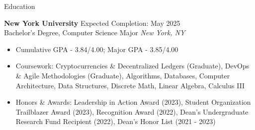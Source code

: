 \documentclass{resume} %
\begin{document}

\begin{rSection}{Education}

	\textbf{New York University} \hfill Expected Completion: May 2025\\
	Bachelor's Degree, Computer Science Major \hfill \textit{New York, NY}
	\begin{itemize}
		\item Cumulative GPA - 3.84/4.00; Major GPA - 3.85/4.00
		\item Coursework: Cryptocurrencies \& Decentralized Ledgers (Graduate), DevOps \& Agile Methodologies (Graduate),
		      Algorithms, Databases, Computer Architecture, Data Structures, Discrete Math,
		      Linear Algebra, Calculus III
		\item Honors \& Awards: Leadership in Action Award (2023), Student Organization Trailblazer Award (2023), Recognition Award (2022), Dean's Undergraduate Research Fund Recipient (2022), Dean's Honor List (2021 - 2023)
	\end{itemize}

\end{rSection}

\end{document}

